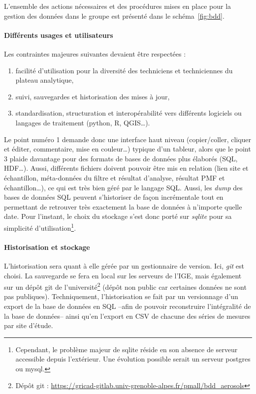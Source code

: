 L'ensemble des actions nécessaires et des procédures mises en place pour la gestion des
données dans le groupe est présenté dans le schéma~\ref{fig:bdd}.

\paragraph{Différents usages et utilisateurs}%
\label{par:différents_usages_et_utilisateurs}

Les contraintes majeures suivantes devaient être respectées :
\begin{enumerate}
    \item facilité d'utilisation pour la diversité des techniciens et techniciennes du
        plateau analytique,
    \item suivi, sauvegardes et historisation des mises à jour,
    \item standardisation, structuration et interopérabilité vers différents logiciels ou
        langages de traitement (python, R, QGIS…).
\end{enumerate}
Le point numéro 1 demande donc une interface haut niveau (copier/coller, cliquer et
éditer, commentaire, mise en couleur…) typique d'un tableur, alors que le point 3 plaide
davantage pour des formats de bases de données plus élaborés (SQL, HDF…).
Aussi, différents fichiers doivent pouvoir être mis en relation (lien site et
échantillon, méta-données du
filtre et résultat d'analyse, résultat PMF et échantillon…), ce qui est très bien géré
par le langage SQL. Aussi, les \textit{dump} des bases de données SQL peuvent s'historiser
de façon incrémentale tout en permettant de retrouver très exactement la base de données à
n'importe quelle date. 
Pour l'instant, le choix du stockage s'est donc porté sur \textit{sqlite} pour sa
simplicité d'utilisation\footnote{Cependant, le problème majeur de sqlite réside en son
    absence de serveur accessible depuis l'extérieur. Une évolution possible serait un
serveur postgres ou mysql.}.

\paragraph{Historisation et stockage}%
\label{par:historisation_et_stockage}

L'historisation sera quant à elle gérée par un gestionnaire de version. Ici, \textit{git}
est choisi. La sauvegarde se fera en local sur les serveurs de l'IGE, mais également sur
un dépôt git de l'université\footnote{Dépôt git :
\url{https://gricad-gitlab.univ-grenoble-alpes.fr/pmall/bdd_aerosols}} (dépôt non
public car certaines données ne sont pas publiques).
Techniquement, l'historisation se fait par un versionnage d'un export de la base de
données en
SQL --afin de pouvoir reconstruire l'intégralité de la base de données-- ainsi qu'en
l'export en CSV de chacune des séries de mesures par site d'étude.

